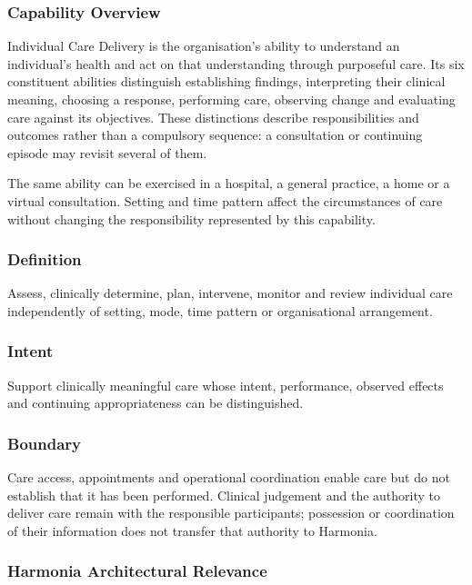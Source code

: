 \subsubsection*{Capability Overview}

Individual Care Delivery is the organisation's ability to understand an individual's health and act on that understanding through purposeful care. Its six constituent abilities distinguish establishing findings, interpreting their clinical meaning, choosing a response, performing care, observing change and evaluating care against its objectives. These distinctions describe responsibilities and outcomes rather than a compulsory sequence: a consultation or continuing episode may revisit several of them.


The same ability can be exercised in a hospital, a general practice, a home or a virtual consultation. Setting and time pattern affect the circumstances of care without changing the responsibility represented by this capability.

\subsubsection*{Definition}

Assess, clinically determine, plan, intervene, monitor and review individual care independently of setting, mode, time pattern or organisational arrangement.

\subsubsection*{Intent}

Support clinically meaningful care whose intent, performance, observed effects and continuing appropriateness can be distinguished.

\subsubsection*{Boundary}

Care access, appointments and operational coordination enable care but do not establish that it has been performed. Clinical judgement and the authority to deliver care remain with the responsible participants; possession or coordination of their information does not transfer that authority to Harmonia.

\subsubsection*{Harmonia Architectural Relevance}


